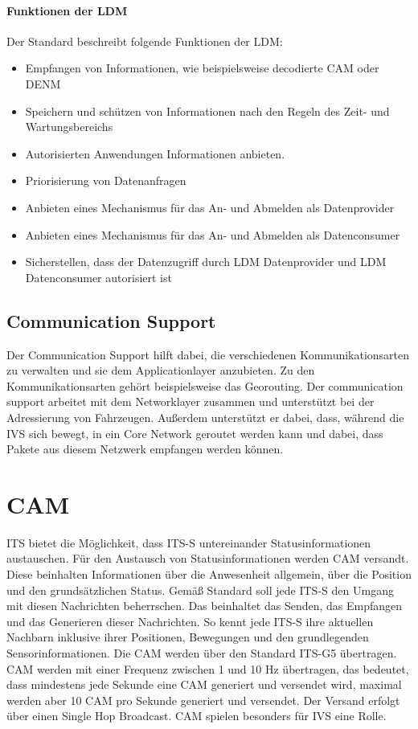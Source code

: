 \paragraph{Funktionen der LDM}
Der Standard \cite{en302895} beschreibt folgende Funktionen der \ac{LDM}:
\begin{itemize}
	\item Empfangen von Informationen, wie beispielsweise decodierte \ac{CAM} oder \ac{DENM}
	\item Speichern und schützen  von Informationen nach den Regeln des Zeit- und Wartungsbereichs
	\item Autorisierten Anwendungen Informationen anbieten. 
	\item Priorisierung von Datenanfragen
	\item Anbieten eines Mechanismus für das An- und Abmelden als Datenprovider
	\item Anbieten eines Mechanismus für das An- und Abmelden als Datenconsumer
	\item Sicherstellen, dass der Datenzugriff durch \ac{LDM} Datenprovider und \ac{LDM} Datenconsumer autorisiert ist
\end{itemize}



\subsection{Communication Support}
Der Communication Support hilft dabei, die verschiedenen Kommunikationsarten zu verwalten und sie dem Applicationlayer anzubieten. Zu den Kommunikationsarten gehört beispielsweise das Georouting. Der communication support arbeitet mit dem Networklayer zusammen und unterstützt bei der Adressierung von Fahrzeugen. Außerdem unterstützt er dabei, dass, während die \ac{IVS} sich bewegt, in ein Core Network geroutet werden kann und dabei, dass Pakete aus diesem Netzwerk empfangen werden können. 

\section{CAM\label{sec:cam}}
\ac{ITS} bietet die Möglichkeit, dass \ac{ITS-S} untereinander Statusinformationen austauschen. Für den Austausch von Statusinformationen werden \ac{CAM} versandt. Diese beinhalten Informationen über die Anwesenheit allgemein, über die Position und den grundsätzlichen Status. Gemäß Standard \cite{ts102637-2} soll jede \ac{ITS-S} den Umgang mit diesen Nachrichten beherrschen. Das beinhaltet das Senden, das Empfangen und das Generieren dieser Nachrichten. So kennt jede \ac{ITS-S} ihre aktuellen Nachbarn inklusive ihrer Positionen, Bewegungen und den grundlegenden Sensorinformationen. Die \ac{CAM} werden über den Standard \ac{ITS-G5} übertragen. \ac{CAM} werden mit einer Frequenz zwischen 1 und 10 Hz übertragen, das bedeutet, dass mindestens jede Sekunde eine \ac{CAM} generiert und versendet wird, maximal werden aber 10 \ac{CAM} pro Sekunde generiert und versendet. Der Versand erfolgt über einen Single Hop Broadcast. \ac{CAM} spielen besonders für \ac{IVS} eine Rolle.


